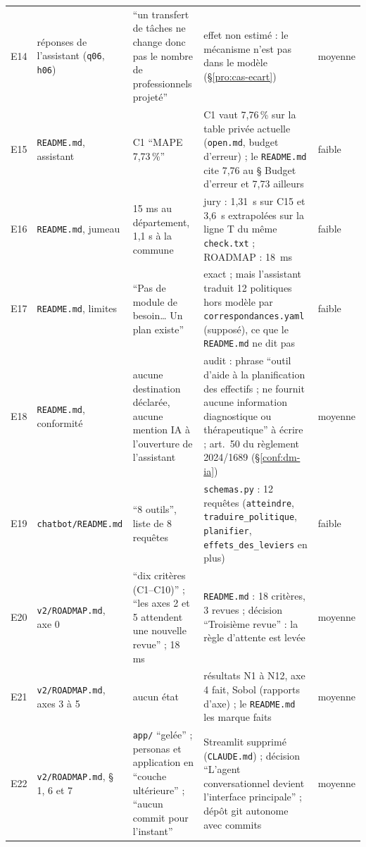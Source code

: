\begin{small}
\begin{longtable}{@{}p{}p{}p{}p{}p{}@{}}
E14 & réponses de l'assistant (\texttt{q06}, \texttt{h06}) & \enquote{un transfert de tâches ne change donc pas le nombre de professionnels projeté} & effet non estimé : le mécanisme n'est pas dans le modèle (§\ref{pro:cas-ecart}) & moyenne \\
E15 & \texttt{README.md}, assistant & C1 \enquote{MAPE 7,73\,\%} & C1 vaut 7,76\mesure{}\,\% sur la table privée actuelle (\texttt{open.md}, budget d'erreur) ; le \texttt{README.md} cite 7,76 au § Budget d'erreur et 7,73 ailleurs & faible \\
E16 & \texttt{README.md}, jumeau & 15 ms au département, 1,1 s à la commune & jury : 1,31\mesure{}~s sur C15 et 3,6\derive{}~s extrapolées sur la ligne T du même \texttt{check.txt} ; ROADMAP : 18\mesure{}~ms & faible \\
E17 & \texttt{README.md}, limites & \enquote{Pas de module de besoin\ldots{} Un plan existe} & exact ; mais l'assistant traduit 12\mesure{} politiques hors modèle par \texttt{correspondances.yaml} (supposé), ce que le \texttt{README.md} ne dit pas & faible \\
E18 & \texttt{README.md}, conformité & aucune destination déclarée, aucune mention IA à l'ouverture de l'assistant & audit : phrase \enquote{outil d'aide à la planification des effectifs ; ne fournit aucune information diagnostique ou thérapeutique} à écrire ; art.~50 du règlement 2024/1689 (§\ref{conf:dm-ia}) & moyenne \\
E19 & \texttt{chatbot/\allowbreak{}README.md} & \enquote{8 outils}, liste de 8 requêtes & \texttt{schemas.py} : 12\mesure{} requêtes (\texttt{atteindre}, \texttt{traduire\_\allowbreak{}politique}, \texttt{planifier}, \texttt{effets\_\allowbreak{}des\_\allowbreak{}leviers} en plus) & faible \\
E20 & \texttt{v2/\allowbreak{}ROADMAP.md}, axe 0 & \enquote{dix critères (C1--C10)} ; \enquote{les axes 2 et 5 attendent une nouvelle revue} ; 18 ms & \texttt{README.md} : 18\mesure{} critères, 3 revues ; décision \enquote{Troisième revue} : la règle d'attente est levée & moyenne \\
E21 & \texttt{v2/\allowbreak{}ROADMAP.md}, axes 3 à 5 & aucun état & résultats N1 à N12, axe 4 fait, Sobol (rapports d'axe) ; le \texttt{README.md} les marque faits & moyenne \\
E22 & \texttt{v2/\allowbreak{}ROADMAP.md}, § 1, 6 et 7 & \texttt{app/\allowbreak{}} \enquote{gelée} ; personas et application en \enquote{couche ultérieure} ; \enquote{aucun commit pour l'instant} & Streamlit supprimé (\texttt{CLAUDE.md}) ; décision \enquote{L'agent conversationnel devient l'interface principale} ; dépôt git autonome avec commits & moyenne \\

\end{longtable}
\end{small}
